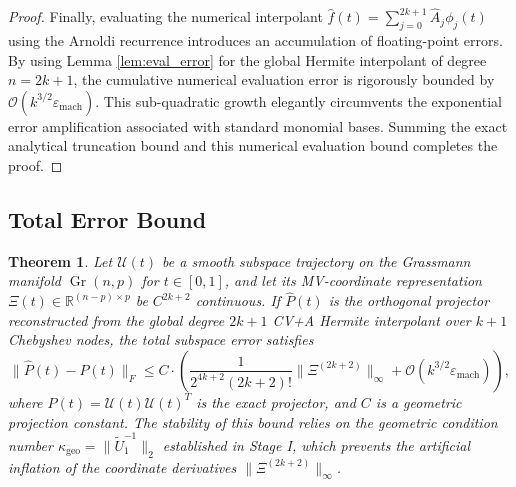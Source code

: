 \documentclass[11pt]{article}
\newtheorem{theorem}{Theorem}
\DeclareMathOperator{\Gr}{Gr}
\begin{document}
\begin{proof}
Finally, evaluating the numerical interpolant $\hat{f}(t) = \sum_{j=0}^{2k+1} \hat{A}_j \phi_j(t)$ using the Arnoldi recurrence introduces an accumulation of floating-point errors. By using Lemma \ref{lem:eval_error} for the global Hermite interpolant of degree $n = 2k+1$, the cumulative numerical evaluation error is rigorously bounded by $\mathcal{O}(k^{3/2} \varepsilon_{\text{mach}})$. This sub-quadratic growth elegantly circumvents the exponential error amplification associated with standard monomial bases. Summing the exact analytical truncation bound and this numerical evaluation bound completes the proof.

\end{proof}

\subsection{Total Error Bound}

\begin{theorem} \label{thm:total_error}
Let $\mathcal{U}(t)$ be a smooth subspace trajectory on the Grassmann manifold $\Gr(n,p)$ for $t \in [0,1]$, and let its MV-coordinate representation $\Xi(t) \in \mathbb{R}^{(n-p) \times p}$ be $C^{2k+2}$ continuous. If $\hat{P}(t)$ is the orthogonal projector reconstructed from the global degree $2k+1$ CV+A Hermite interpolant over $k+1$ Chebyshev nodes, the total subspace error satisfies
\begin{equation} \label{eq:total_bound_final}
\|\hat{P}(t) - P(t)\|_F \leq C \cdot \left( \frac{1}{2^{4k+2}(2k+2)!} \|\Xi^{(2k+2)}\|_\infty + \mathcal{O}(k^{3/2} \varepsilon_{\mathrm{mach}}) \right),
\end{equation}
where $P(t) = \mathcal{U}(t)\mathcal{U}(t)^T$ is the exact projector, and $C$ is a geometric projection constant. The stability of this bound relies on the geometric condition number $\kappa_{\mathrm{geo}} = \|\widetilde{U}_1^{-1}\|_2$ established in Stage I, which prevents the artificial inflation of the coordinate derivatives $\|\Xi^{(2k+2)}\|_\infty$.
\end{theorem}
\end{document}
